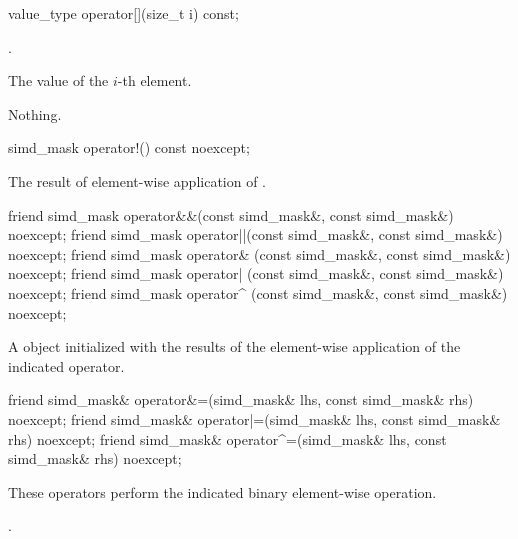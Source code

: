 \begin{itemdecl}
value_type operator[](size_t i) const;
\end{itemdecl}
\begin{itemdescr}
  \pnum\requires {}.

  \pnum\returns The value of the $i$-th element.

  \pnum\throws Nothing.
\end{itemdescr}

\begin{itemdecl}
simd_mask operator!() const noexcept;
\end{itemdecl}
\begin{itemdescr}
  \pnum\returns The result of element-wise application of .
\end{itemdescr}


\begin{itemdecl}
friend simd_mask operator&&(const simd_mask&, const simd_mask&) noexcept;
friend simd_mask operator||(const simd_mask&, const simd_mask&) noexcept;
friend simd_mask operator& (const simd_mask&, const simd_mask&) noexcept;
friend simd_mask operator| (const simd_mask&, const simd_mask&) noexcept;
friend simd_mask operator^ (const simd_mask&, const simd_mask&) noexcept;
\end{itemdecl}
\begin{itemdescr}
  \pnum\returns A \mask object initialized with the results of the element-wise application of the indicated operator.
\end{itemdescr}

\begin{itemdecl}
friend simd_mask& operator&=(simd_mask& lhs, const simd_mask& rhs) noexcept;
friend simd_mask& operator|=(simd_mask& lhs, const simd_mask& rhs) noexcept;
friend simd_mask& operator^=(simd_mask& lhs, const simd_mask& rhs) noexcept;
\end{itemdecl}
\begin{itemdescr}
  \pnum\effects These operators perform the indicated binary element-wise operation.

  \pnum\returns {}.
\end{itemdescr}

